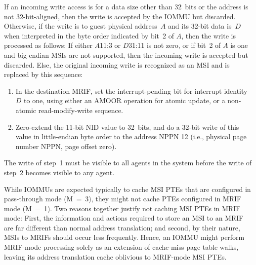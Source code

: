 If an incoming write access is for a data size other
than 32~bits or the address is not \mbox{32-bit}-aligned,
then the write is accepted by the IOMMU but discarded.
Otherwise, if the write is to guest physical address~$A$ and its
\mbox{32-bit} data is~$D$ when interpreted in the byte order indicated
by bit~2 of $A$, then the write is processed as follows:
If either $A$\z{[}11:3\z{]} or $D$\z{[}31:11\z{]} is not zero, or if
bit~2 of $A$ is one and big-endian MSIs are not supported, then the
incoming write is accepted but discarded.
Else, the original incoming write is recognized
as an MSI and is replaced by this sequence:
\begin{enumerate}

\item
In the destination MRIF, set the interrupt-pending bit for interrupt
identity $D$ to one, using either an AMOOR operation for atomic update,
or a non-atomic read-modify-write sequence.

\item
Zero-extend the \mbox{11-bit} NID value to 32~bits, and do a
\mbox{32-bit} write of this value in little-endian byte order to the
address NPPN\,\z{<<}\,12 (i.e., physical page number NPPN, page offset
zero).

\end{enumerate}
The write of step~1 must be visible to all agents in the system before
the write of step~2 becomes visible to any agent.

\begin{commentary}
While \mbox{IOMMU}s are expected typically to cache MSI PTEs that are
configured in pass-through mode (M~=~3), they might not cache PTEs
configured in MRIF mode (M~=~1).
Two reasons together justify not caching MSI PTEs in MRIF mode:
First, the information and actions required to store an MSI to an MRIF
are far different than normal address translation; and
second, by their nature, MSIs to MRIFs should occur less frequently.
Hence, an \mbox{IOMMU} might perform MRIF-mode processing solely as
an extension of cache-miss page table walks, leaving its address
translation cache oblivious to MRIF-mode MSI PTEs.
\end{commentary}

